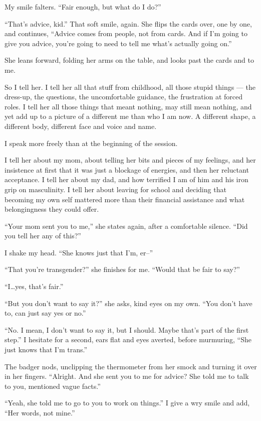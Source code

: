 My smile falters. ``Fair enough, but what do I do?''

``That's advice, kid.'' That soft smile, again. She flips the cards over, one by one, and continues, ``Advice comes from people, not from cards. And if I'm going to give you advice, you're going to need to tell me what's actually going on.''

She leans forward, folding her arms on the table, and looks past the cards and to me.

So I tell her. I tell her all that stuff from childhood, all those stupid things --- the dress-up, the questions, the uncomfortable guidance, the frustration at forced roles. I tell her all those things that meant nothing, may still mean nothing, and yet add up to a picture of a different me than who I am now. A different shape, a different body, different face and voice and name.

I speak more freely than at the beginning of the session.

I tell her about my mom, about telling her bits and pieces of my feelings, and her insistence at first that it was just a blockage of energies, and then her reluctant acceptance. I tell her about my dad, and how terrified I am of him and his iron grip on masculinity. I tell her about leaving for school and deciding that becoming my own self mattered more than their financial assistance and what belongingness they could offer.

``Your mom sent you to me,'' she states again, after a comfortable silence. ``Did you tell her any of this?''

I shake my head. ``She knows just that I'm, er--''

``That you're transgender?'' she finishes for me. ``Would that be fair to say?''

``I\ldots{}yes, that's fair.''

``But you don't want to say it?'' she asks, kind eyes on my own. ``You don't have to, can just say yes or no.''

``No. I mean, I don't want to say it, but I should. Maybe that's part of the first step.'' I hesitate for a second, ears flat and eyes averted, before murmuring, ``She just knows that I'm trans.''

The badger nods, unclipping the thermometer from her smock and turning it over in her fingers. ``Alright. And she sent you to me for advice? She told me to talk to you, mentioned vague facts.''

``Yeah, she told me to go to you to work on things.'' I give a wry smile and add, ``Her words, not mine.''

